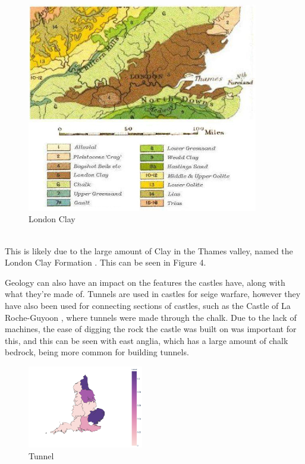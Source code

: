\documentclass[11pt]{article}
\begin{document}
\begin{minipage}{0.45\textwidth}
	\begin{figure}[H]
		\centering
		\includegraphics[width=0.9\textwidth]{Geological_map_of_London_Basin.jpg}
		\caption{London Clay}
	\end{figure}
\end{minipage}
\vspace{1cm}
\\
This is likely due to the large amount of Clay in the Thames valley, named the London Clay Formation \cite{sumbler1996london}. This can be seen in Figure 4.

Geology can also have an impact on the features the castles have, along with what they're made of. Tunnels are used in castles for seige warfare, however they have also been used for connecting sections of castles, such as the Castle of La Roche-Guyoon \cite{HislopMalcolm2016Cb:a}, where tunnels were made through the chalk. Due to the lack of machines, the ease of digging the rock the castle was built on was important for this, and this can be seen with east anglia, which has a large amount of chalk bedrock, being more common for building tunnels.

\begin{figure}[H]
	\centering
	\includegraphics[width=0.45\textwidth]{tunnel.png}
	\caption{Tunnel}
\end{figure}
\end{document}
